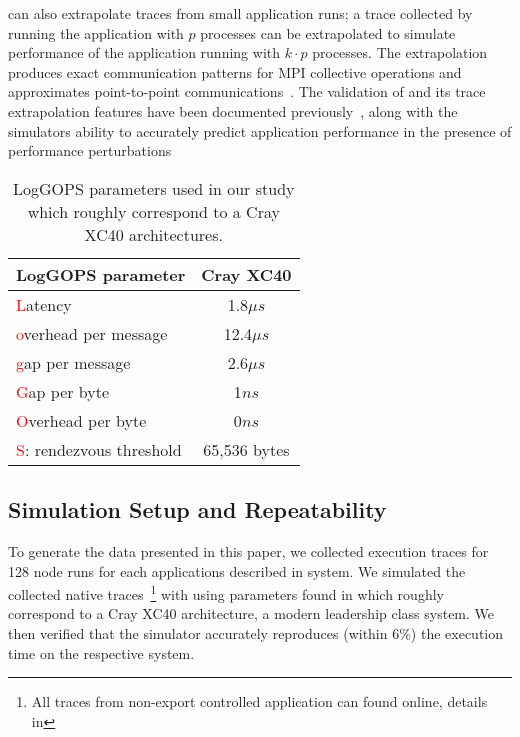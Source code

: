 \LogGOPSim can also extrapolate traces from small application runs; a trace
collected by running the application with $p$ processes can be extrapolated to
simulate performance of the application running with $k\cdot p$ processes. The
extrapolation produces exact communication patterns for MPI collective
operations and approximates point-to-point
communications~\cite{Hoefler:2010:LogGOPSim}.  The validation of \LogGOPSim and
its trace extrapolation features have been documented
previously~\cite{Hoefler:2010:LogGOPSim}, along with the simulators ability to
accurately predict application performance in the presence of performance
perturbations~\cite{Ferreira:2014:Understanding,Levy2013UsingSimulation,Hoefler:2010:Characterizing}

\begin{table}
\centering
\begin{tabular}{ l c }
\toprule
LogGOPS parameter & Cray XC40 \\
\midrule
\textcolor{red}{L}atency                & 1.8$\mu s$ \\
\textcolor{red}{o}verhead per message   & 12.4$\mu s$ \\
\textcolor{red}{g}ap per message        & 2.6$\mu s$  \\
\textcolor{red}{G}ap per byte           & 1$ns$     \\
\textcolor{red}{O}verhead per byte      & 0$ns$     \\
\textcolor{red}{S}: rendezvous threshold& 65,536 bytes \\
\bottomrule
\end{tabular}
\vspace{.6em}
\caption{
  LogGOPS parameters used in our study which roughly correspond to a Cray
  XC40 architectures.
}
\label{tab:logp}
\end{table}

\subsection{Simulation Setup and Repeatability}

To generate the data presented in this paper, we collected execution traces for
128 node runs for each applications described in  system.  We
simulated the collected native traces~\footnote{All traces from non-export
controlled application can found online, details in } with
\LogGOPSim using parameters found in  which roughly correspond to
a Cray XC40 architecture, a modern leadership class system. We then verified
that the simulator accurately reproduces (within 6\%) the execution time on the
respective system.

